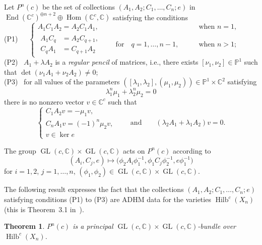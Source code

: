 \documentclass[pdftex]{sigma}
\numberwithin{equation}{section}
\newtheorem{Theorem}{Theorem}[section]
\begin{document}
Let $P^{n}(c)$ be the set of collections $(A_1,A_2;C_1,\dots,C_{n};e)$
in $\operatorname{End}(\mathbb{C}^{c})^{\oplus n+2}\oplus\operatorname{Hom}(\mathbb{C}^{c},\mathbb{C})$ sa\-tisfying the conditions\\[8pt]
(P1)\ \ \
$\displaystyle
\begin{cases}
A_1C_1A_{2}=A_2C_{1}A_{1},&\qquad\text{when $n=1$},\\[2pt]
\begin{aligned}
A_1C_q&=A_2C_{q+1},\\
C_qA_1&=C_{q+1}A_2
\end{aligned}
\qquad\text{for}\quad q=1,\dots,n-1,&\qquad\text{when $n>1$;}
\end{cases}
$
\\[8pt]
(P2) \
$A_1+\lambda A_2$ is a \emph{regular pencil} of matrices, i.e., there exists $[\nu_{1},\nu_{2}]\in\mathbb{P}^1$ such that $\det(\nu_1A_1+\nu_2A_2)\neq0$;
\\[8pt]
(P3) \
for all values of the parameters $ ([\lambda_1,\lambda_2],(\mu_1,\mu_{2}) )\in\mathbb{P}^1\times\mathbb{C}^{2}$ satisfying
\begin{equation*}
\lambda_{1}^{n}\mu_{1}+\lambda_{2}^{n}\mu_{2}=0
\end{equation*}
there is no nonzero vector $v\in\mathbb{C}^c$ such that
\begin{equation*}
\begin{cases}
C_{1}A_{2}v=-\mu_1v,\\
C_{n}A_{1}v=(-1)^n\mu_2v,\\
v\in\ker e
\end{cases}
\qquad\text{and}\qquad\left(\lambda_2{A_1}+\lambda_1{A_2}\right)v=0 .
\end{equation*}

The group
$\operatorname{GL}(c, \mathbb{C})\times \operatorname{GL}(c, \mathbb{C})$ acts on $P^n(c)$ according to
\begin{equation*} (A_i, C_j, e ) \mapsto \big(\phi_2A_i\phi_1^{-1},\phi_1C_j\phi_2^{-1}, e\phi_1^{-1}\big)
\end{equation*}
for $i=1,2$, $j=1,\dots,n$, $ (\phi_1,\phi_2)\in\operatorname{GL}(c, \mathbb{C})\times \operatorname{GL}(c, \mathbb{C})$.

 The following result expresses the fact that the collections $(A_1,A_2;C_1,\dots,C_{n};e)$ satisfying
 conditions (P1) to (P3) are ADHM data for the varieties $\operatorname{Hilb}^c (X_{n})$ (this is Theorem~3.1 in~\cite{bbr}).
 \begin{Theorem}\label{thm0}
$P^{n}(c)$ is a principal $\operatorname{GL}(c, \mathbb{C})\times \operatorname{GL}(c, \mathbb{C})$-bundle over $\operatorname{Hilb}^c (X_{n})$.
\end{Theorem}
\end{document}
